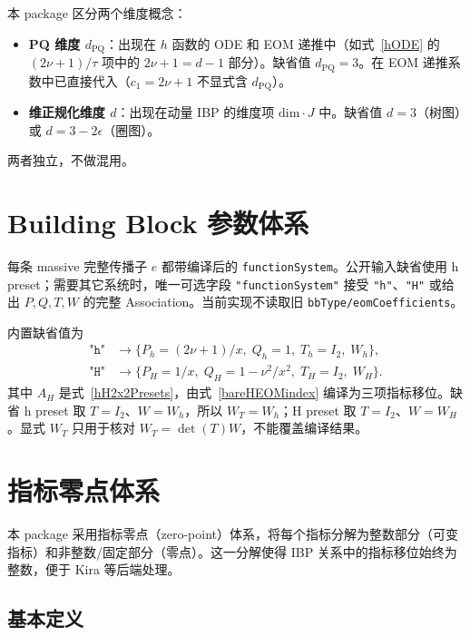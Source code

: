 ﻿\documentclass[a4paper,11pt]{article}
\begin{document}
本 package 区分两个维度概念：

\begin{itemize}
  \item \textbf{PQ 维度 $d_{\text{PQ}}$}：出现在 $h$ 函数的 ODE 和 EOM 递推中（如式~\eqref{hODE} 的 $(2\nu+1)/\tau$ 项中的 $2\nu+1 = d-1$ 部分）。缺省值 $d_{\text{PQ}} = 3$。在 EOM 递推系数中已直接代入（$c_1 = 2\nu+1$ 不显式含 $d_{\text{PQ}}$）。
  \item \textbf{维正规化维度 $d$}：出现在动量 IBP 的维度项 $\text{dim} \cdot J$ 中。缺省值 $d = 3$（树图）或 $d = 3 - 2\epsilon$（圈图）。
\end{itemize}

两者独立，不做混用。

\section{Building Block 参数体系}

每条 massive 完整传播子 $e$ 都带编译后的 \texttt{functionSystem}。公开输入缺省使用 h preset；需要其它系统时，唯一可选字段 \texttt{"functionSystem"} 接受 \texttt{"h"}、\texttt{"H"} 或给出 $P,Q,T,W$ 的完整 Association。当前实现不读取旧 \texttt{bbType/eomCoefficients}。

内置缺省值为
\begin{align}
  \texttt{"h"} &\to \{P_h=(2\nu+1)/x,\;Q_h=1,\;T_h=I_2,\;W_h\}, \label{bbH} \\
  \texttt{"H"} &\to \{P_H=1/x,\;Q_H=1-\nu^2/x^2,\;T_H=I_2,\;W_H\}. \label{bbHankel}
\end{align}
其中 $A_H$ 是式~\eqref{hH2x2Presets}，由式~\eqref{bareHEOMindex} 编译为三项指标移位。缺省 h preset 取 $T=I_2$、$W=W_h$，所以 $W_T=W_h$；H preset 取 $T=I_2$、$W=W_H$。显式 $W_T$ 只用于核对 $W_T=\det(T)W$，不能覆盖编译结果。

\section{指标零点体系}

本 package 采用指标零点（zero-point）体系，将每个指标分解为整数部分（可变指标）和非整数/固定部分（零点）。这一分解使得 IBP 关系中的指标移位始终为整数，便于 Kira 等后端处理。

\subsection{基本定义}
\end{document}
